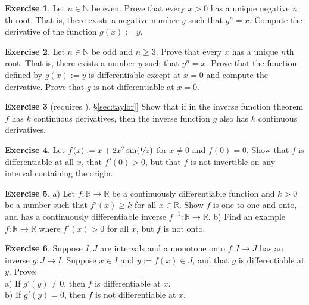 \documentclass[12pt]{book}
\newcommand{\R}{{\mathbb{R}}}
\newcommand{\N}{{\mathbb{N}}}
\theoremstyle{plain}
\theoremstyle{remark}
\theoremstyle{definition}
\theoremstyle{exercise}
\newtheorem{exercise}{Exercise}[section]
\theoremstyle{example}
\newcommand{\sectionref}[1]{\hyperref[#1]{\S\ref*{#1}}}
\begin{document}
\begin{exercise}
Let $n\in \N$ be even.
Prove that every $x > 0$ has a unique negative $n$th root.
That is, there exists a negative number $y$ such that $y^n = x$.
Compute the derivative
of the function $g(x) := y$.
\end{exercise}

\begin{exercise} \label{exercise:oddroot}
Let $n \in \N$ be odd and $n \geq 3$.
Prove that every $x$ has a unique $n$th root.
That is, there exists a number $y$ such that $y^n = x$.  Prove that
the function defined by $g(x) := y$ is differentiable except at $x=0$
and compute the derivative.  Prove that $g$ is not differentiable at $x=0$.
\end{exercise}

\begin{exercise}[requires \sectionref{sec:taylor}]
Show that if in the inverse function theorem $f$ has $k$ continuous
derivatives, then the inverse function $g$ also has $k$ continuous
derivatives.
\end{exercise}

\begin{exercise}
Let $f(x) := x + 2 x^2 \sin(\nicefrac{1}{x})$ for $x \not= 0$ and
$f(0) = 0$.  Show that $f$ is differentiable at all $x$, that $f'(0) > 0$,
but that $f$ is not invertible
on any interval containing the origin.
\end{exercise}

\begin{exercise}
a) Let $f \colon \R \to \R$ be a continuously differentiable function
and $k > 0$ be a number such that $f'(x) \geq k$ for all $x \in \R$.
Show $f$ is one-to-one and onto, and has a continuously differentiable
inverse $f^{-1} \colon \R \to \R$. b) Find an example $f \colon \R \to \R$
where $f'(x) > 0$
for all $x$, but $f$ is not onto.
\end{exercise}

\begin{exercise}
Suppose $I,J$ are intervals and a monotone onto $f \colon I \to J$ has an inverse $g \colon J \to I$.
Suppose $x \in I$ and $y := f(x) \in J$, and that $g$ is differentiable at
$y$.  Prove:
\\
a) If $g'(y) \not= 0$, then $f$ is differentiable at $x$.
\\
b) If $g'(y) = 0$, then $f$ is not differentiable at $x$.
\end{exercise}


\end{document}
